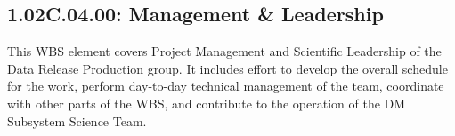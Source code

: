 \subsection{1.02C.04.00: Management \& Leadership}

This WBS element covers Project Management and Scientific Leadership of
the Data Release Production group. It includes effort to develop the
overall schedule for the work, perform day-to-day technical management
of the team, coordinate with other parts of the WBS, and contribute to
the operation of the DM Subsystem Science Team.
